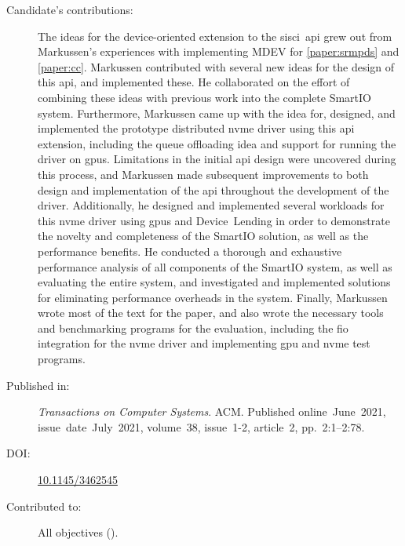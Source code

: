 \begin{description}
	\item[Candidate's contributions:]
		The ideas for the device-oriented extension to the \gls{sisci}~\gls{api} grew out from Markussen's experiences with implementing MDEV for \cref{paper:srmpds} and \cref{paper:cc}.
		Markussen contributed with several new ideas for the design of this \gls{api}, and implemented these.
		He collaborated on the effort of combining these ideas with previous work into the complete SmartIO system. 
		Furthermore, Markussen came up with the idea for, designed, and implemented the prototype distributed \gls{nvme} driver using this \gls{api} extension, 
		including the queue offloading idea and support for running the driver on \glspl{gpu}.
		Limitations in the initial \gls{api} design were uncovered during this process, and Markussen made subsequent improvements to both design and implementation of the \gls{api} throughout the development of the driver.
		Additionally, he designed and implemented several workloads for this \gls{nvme} driver using \glspl{gpu} and Device~Lending
		in order to demonstrate the novelty and completeness of the SmartIO solution, as well as the performance benefits.
		He conducted a thorough and exhaustive performance analysis of all components of the SmartIO system,
		as well as evaluating the entire system, and investigated and implemented solutions for eliminating performance overheads in the system.
		Finally, Markussen wrote most of the text for the paper, and also wrote the necessary tools and benchmarking programs for the evaluation,
		including the \gls{fio} integration for the \gls{nvme} driver and implementing \gls{gpu} and \gls{nvme} test programs.
		

	\item[Published in:]
		\emph{Transactions on Computer Systems}. ACM.
		Published online~June~2021,
		issue~date~July~2021, 
		volume~38, issue~1-2, article~2, pp.~2:1--2:78.

	\item[DOI:] \href{https://doi.org/10.1145/3462545}{10.1145/3462545}

	\item[Contributed to:]
		All objectives ().

\end{description}

